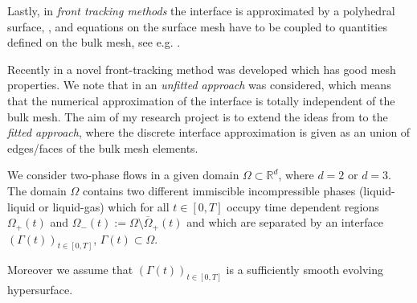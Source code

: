 \documentclass[a4paper,11pt, onecolumn]{article}
\newcommand{\cor}[1]{\textit{#1}} %
\begin{document}
\noindent Lastly, in \cor{front tracking methods} the interface is approximated by a polyhedral surface, \cite{DeckelnickDE05}, and equations on the surface mesh have to be coupled to quantities defined on the bulk mesh, see e.g.  \cite{UnverdiT92,Bansch01,Tryggvason_etal01,GanesanMT07}.
\newline

\noindent Recently in \cite{spurious,fluidfbp} a novel front-tracking method was developed which has good mesh properties. We note that in \cite{spurious,fluidfbp} an \cor{unfitted approach} was considered, which means that the numerical approximation of the interface is totally independent of the bulk mesh. The aim of my research project is to extend the ideas from \cite{spurious,fluidfbp} to the \cor{fitted approach}, where the discrete interface approximation is given as an union of edges/faces of the bulk mesh elements.
\newline

\noindent We consider two-phase flows in a given domain $\Omega\subset\mathbb{R}^d$, where $d=2$ or $d=3$. The domain $\Omega$ contains two different immiscible incompressible phases (liquid-liquid or liquid-gas) which for all $t\in[0,T]$ occupy time dependent regions $\Omega_+(t)$ and $\Omega_-(t):=\Omega\setminus\overline{\Omega}_+(t)$ and which are separated by an interface $(\Gamma(t))_{t\in[0,T]}$, $\Gamma(t)\subset\Omega$. 

\noindent Moreover we assume that $(\Gamma(t))_{t\in [0,T]}$ is a sufficiently smooth evolving hypersurface.
\newline
\end{document}
